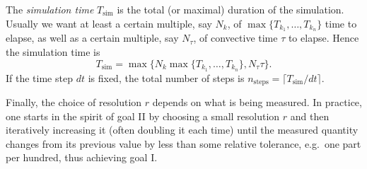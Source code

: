 \documentclass[10pt]{article}
\newcommand\defn[1]{\emph{#1}}
\def\eg{e.g.~}
\begin{document}
The \defn{simulation time} $T_\text{sim}$ is the total (or maximal) duration of the simulation.  Usually we want at least a certain multiple, say $N_k$, of $\max\{T_{k_1},\ldots,T_{k_n}\}$ time to elapse, as well as a certain multiple, say $N_\tau$, of convective time $\tau$ to elapse.  Hence the simulation time is \[T_\text{sim}=\max\{N_k\max\{T_{k_1},\ldots,T_{k_n}\},N_\tau\tau\}.\]  If the time step $dt$ is fixed, the total number of steps is $n_\text{steps}=\lceil T_\text{sim}/dt\rceil$.

Finally, the choice of resolution $r$ depends on what is being measured.  In practice, one starts in the spirit of goal II by choosing a small resolution $r$ and then iteratively increasing it (often doubling it each time) until the measured quantity changes from its previous value by less than some relative tolerance, \eg one part per hundred, thus achieving goal I.
\end{document}
